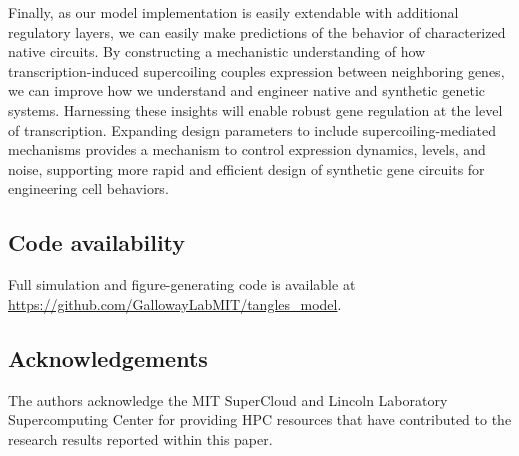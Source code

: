 \documentclass[11pt]{article}
\begin{document}
Finally, as our model implementation is easily extendable with additional regulatory layers, we can easily make predictions of the behavior of characterized native circuits. By constructing a mechanistic understanding of how transcription-induced supercoiling couples expression between neighboring genes, we can improve how we understand and engineer native and synthetic genetic systems. Harnessing these insights will enable robust gene regulation at the level of transcription. Expanding design parameters to include supercoiling-mediated mechanisms provides a mechanism to control expression dynamics, levels, and noise, supporting more rapid and efficient design of synthetic gene circuits for engineering cell behaviors. 

\subsection{Code availability}
Full simulation and figure-generating code is available at \url{https://github.com/GallowayLabMIT/tangles_model}.

\subsection{Acknowledgements}
The authors acknowledge the MIT SuperCloud and Lincoln Laboratory Supercomputing Center \parencite{reutherInteractiveSupercomputing402018} for providing HPC resources that have contributed to the research results reported within this paper.

\printbibliography

\clearpage
\appendix
\titleformat{\subsection}[hang]{\bfseries}{\thesubsection}{0em}{\;\;}
\renewcommand{\appendixpagename}{Supplemental information}
\renewcommand{\thefigure}{S\arabic{figure}}
\renewcommand{\theequation}{S\arabic{equation}}
\setcounter{equation}{0}
\setcounter{figure}{0}
\appendixpage
\end{document}

